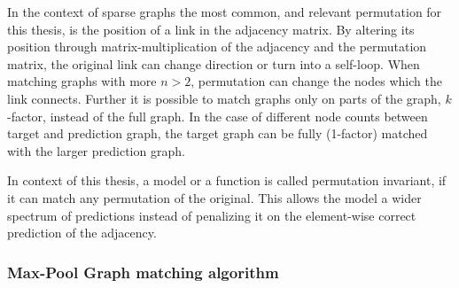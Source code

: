 {{In the context of sparse graphs the most common, and relevant permutation for this thesis, is the position of a link in the adjacency matrix. By altering its position through matrix-multiplication of the adjacency and the permutation matrix, the original link can change direction or turn into a self-loop. When matching graphs with more $n>2$, permutation can change the nodes which the link connects. Further it is possible to match graphs only on parts of the graph, $k$-factor, instead of the full graph. In the case of different node counts between target and prediction graph, the target graph can be fully (1-factor) matched with the larger prediction graph. 

In context of this thesis, a model or a function is called permutation invariant, if it can match any permutation of the original. This allows the model a wider spectrum of predictions instead of penalizing it on the element-wise correct prediction of the adjacency.


\subsubsection{Max-Pool Graph matching algorithm}


}}
